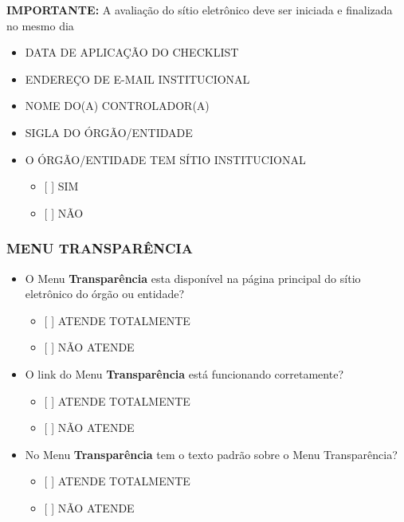 \documentclass[]{book}
\providecommand{\tightlist}{%
  \setlength{\itemsep}{0pt}\setlength{\parskip}{0pt}}
\begin{document}
\textbf{IMPORTANTE:} A avaliação do sítio eletrônico deve ser iniciada e finalizada no mesmo dia

\begin{itemize}
\tightlist
\item
  DATA DE APLICAÇÃO DO CHECKLIST
\item
  ENDEREÇO DE E-MAIL INSTITUCIONAL
\item
  NOME DO(A) CONTROLADOR(A)
\item
  SIGLA DO ÓRGÃO/ENTIDADE
\item
  O ÓRGÃO/ENTIDADE TEM SÍTIO INSTITUCIONAL

  \begin{itemize}
  \tightlist
  \item
    {[} {]} SIM
  \item
    {[} {]} NÃO
  \end{itemize}
\end{itemize}

\hypertarget{menu-transparuxeancia-1}{%
\subsubsection*{MENU TRANSPARÊNCIA}\label{menu-transparuxeancia-1}}

\begin{itemize}
\tightlist
\item
  O Menu \textbf{Transparência} esta disponível na página principal do sítio eletrônico do órgão ou entidade?

  \begin{itemize}
  \tightlist
  \item
    {[} {]} ATENDE TOTALMENTE
  \item
    {[} {]} NÃO ATENDE
  \end{itemize}
\item
  O link do Menu \textbf{Transparência} está funcionando corretamente?

  \begin{itemize}
  \tightlist
  \item
    {[} {]} ATENDE TOTALMENTE
  \item
    {[} {]} NÃO ATENDE
  \end{itemize}
\item
  No Menu \textbf{Transparência} tem o texto padrão sobre o Menu Transparência?

  \begin{itemize}
  \tightlist
  \item
    {[} {]} ATENDE TOTALMENTE
  \item
    {[} {]} NÃO ATENDE
  \end{itemize}
\end{itemize}
\end{document}
